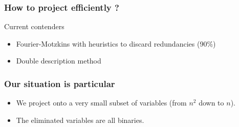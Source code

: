 \documentclass{beamer}
\begin{document}
\begin{frame}
  \frametitle{How to project efficiently ?}
  Current contenders
  \begin{itemize}
  \item<1-> Fourier-Motzkins with heuristics to discard redundancies (90\%)
  \item<2-> Double description method
  \end{itemize}
\end{frame}

\begin{frame}
  \frametitle{Our situation is particular}
  \begin{itemize}
  \item We project onto a very small subset of variables (from $n^2$ down to $n$).
  \item The eliminated variables are all binaries.
  \end{itemize}
\end{frame}
\end{document}
